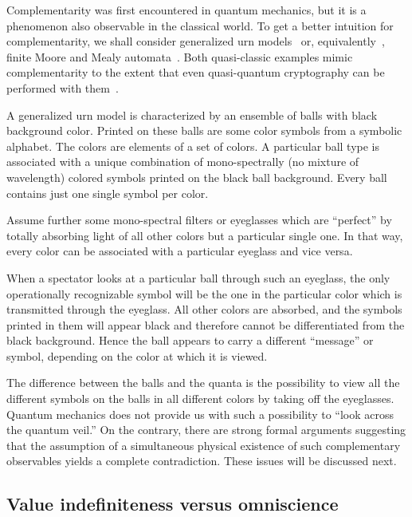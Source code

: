 \documentclass[rmp,amsfonts,showpacs,showkeys,twocolumn]{revtex4}
\begin{document}
Complementarity was first encountered in quantum mechanics,
but it is a phenomenon also observable in the classical world.
To get a better intuition for complementarity, we shall consider generalized urn models~\cite{wright,wright:pent} or,
equivalently~\cite{svozil-2001-eua},
finite Moore and Mealy automata~\cite{e-f-moore,schaller-96,dvur-pul-svo,cal-sv-yu}.
Both quasi-classic examples mimic complementarity to the extent that even quasi-quantum cryptography
can be performed with them~\cite{svozil-2005-ln1e}.


A generalized urn model is
characterized by an ensemble of balls with black background color.
Printed on these balls are some color symbols from a symbolic alphabet.
The colors are elements of a set of colors.
A particular ball type is associated with a unique combination of mono-spectrally
(no mixture of wavelength) colored symbols
printed on the black ball background.
Every ball contains just one single symbol per color.

Assume further some mono-spectral filters or eyeglasses which are
``perfect'' by totally absorbing light of all other colors
but a particular single one.
In that way, every color can be associated with a particular eyeglass and vice versa.

When a spectator looks at a particular ball through such an eyeglass,
the only operationally recognizable symbol will be the one in the particular
color which is transmitted through the eyeglass.
All other colors are absorbed, and the symbols printed in them will appear black
and therefore cannot be differentiated from the black background.
Hence the ball appears to carry a different ``message'' or symbol,
depending on the color at which it is viewed.

The difference between the balls and the quanta is the possibility
to view all the different symbols on the balls
in all different colors by taking off the eyeglasses.
Quantum mechanics does not provide us with such a possibility to ``look across the quantum veil.''
On the contrary, there are strong formal arguments suggesting
that the assumption of a simultaneous
physical existence of such complementary observables yields a complete contradiction.
These issues will be discussed next.


\subsection{Value indefiniteness versus omniscience}
\end{document}
